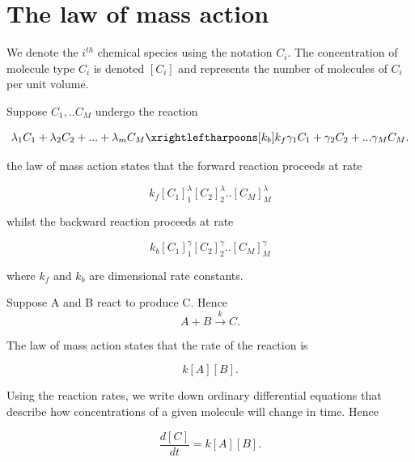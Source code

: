 \documentclass[
  letterpaper,
  DIV=11,
  numbers=noendperiod]{scrreprt}
\begin{document}
\hypertarget{the-law-of-mass-action}{%
\section{The law of mass action}\label{the-law-of-mass-action}}

We denote the \(i^{th}\) chemical species using the notation \(C_i\).
The concentration of molecule type \(C_i\) is denoted \([C_i]\) and
represents the number of molecules of \(C_i\) per unit volume.

Suppose \(C_1,..C_M\) undergo the reaction

\[
\lambda_1C_1+\lambda_2 C_2+...+\lambda_m C_M \xrightleftharpoons[k_{b}]{k_{f}} 
 \gamma_1 C_1+\gamma_2 C_2 + ... \gamma_M C_M.
\]

the law of mass action states that the forward reaction proceeds at rate

\[
k_f[C_1]^\lambda_1 [C_2]^\lambda_2 ..[C_M]^\lambda_M
\]

whilst the backward reaction proceeds at rate

\[
k_b[C_1]^\gamma_1[C_2]^\gamma_2 ..[C_M]^\gamma_M
\]

where \(k_f\) and \(k_b\) are dimensional rate constants.

\begin{tcolorbox}[enhanced jigsaw, bottomtitle=1mm, rightrule=.15mm, colback=white, leftrule=.75mm, title=\textcolor{quarto-callout-note-color}{\faInfo}\hspace{0.5em}{Note}, bottomrule=.15mm, coltitle=black, toptitle=1mm, breakable, colframe=quarto-callout-note-color-frame, titlerule=0mm, toprule=.15mm, opacitybacktitle=0.6, arc=.35mm, colbacktitle=quarto-callout-note-color!10!white, left=2mm, opacityback=0]

Suppose A and B react to produce C. Hence \[
A+B\xrightarrow{k}  C.
\]

The law of mass action states that the rate of the reaction is

\[
k[A][B].
\]

Using the reaction rates, we write down ordinary differential equations
that describe how concentrations of a given molecule will change in
time. Hence

\[
\frac{d[C]}{dt}=k[A][B].
\]

\end{tcolorbox}
\end{document}
